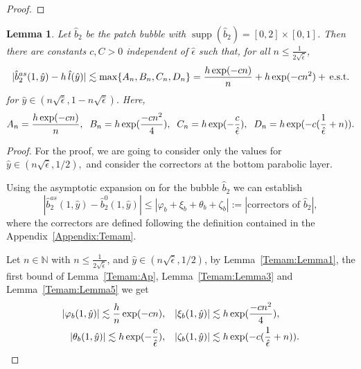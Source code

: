 \documentclass{article}
\newcommand{\est}{\text{\,e.s.t.}\xspace}
\newtheorem{lemma}[thm]{Lemma}
\newcommand{\N}{\ensuremath{\mathbb{N}}\xspace}
\DeclareMathOperator{\supp}{supp}
\newcommand{\hatb}{\ensuremath{\hat{b}}}
\newcommand{\haty}{\ensuremath{{\hat{y}}}}
\newcommand{\hatnsep}{\ensuremath{n\sqrt{\hat{\epsilon}}}}
\begin{document}
\begin{appendix}
\begin{proof}

\end{proof}


\begin{lemma}\label{lemma:new_lemma}
Let $\hat{b}_2$ be the patch bubble with $\supp(\hat{b}_2)=[0,2]\times[0,1]$. Then there are constants $c,C>0$ independent of $\hat{\epsilon}$ such that, for all $n\leq \frac{1}{2\sqrt{\hat{\epsilon}}}$,
\begin{equation*}
| \hatb_2^{as}(1,\hat y) - h\,\hat l(\haty)|\lesssim \max\{A_n,B_n,C_n,D_n\}=\frac{h\exp(-cn)}{n}+h\exp(-cn^2) + \est 
\end{equation*}
for $\haty\in(\hatnsep,1-\hatnsep).$ Here,
\begin{equation*}
    A_n = \frac{h\exp(-cn)}{n},\hspace{0.2 cm}
    B_n = h\exp(\frac{-c n^2}{4}),
    \hspace{0.2 cm}
    C_n = h\exp(-\frac{c}{\hat{\epsilon}}),
    \hspace{0.2 cm}
    D_n = h\exp(-c(\frac{1}{\hat{\epsilon}}+n)).
\end{equation*}
\end{lemma}

\begin{proof}
For the proof, we are going to consider only the values for $\haty\in(\hatnsep,1/2),$ and consider the correctors at the bottom parabolic layer. 

Using the asymptotic expansion on \cite{GieEtAl:13} for the bubble $\hatb_2$ we can establish
\begin{equation*}
    |\hatb_2^{as}(1,\haty)-\hatb_2^0(1,\haty)|\leq |\varphi_b + \xi_b +\theta_b + \zeta_b| :=
    |\text{correctors of $\hatb_2$}|,
\end{equation*}
where the correctors  are defined following the definition contained in the Appendix~\ref{Appendix:Temam}.

Let $n\in\N$ with $n\leq \frac{1}{2\sqrt{\hat{\epsilon}}}$, and $\haty\in(\hatnsep,1/2)$, by  Lemma~\ref{Temam:Lemma1},  the first bound of Lemma~\ref{Temam:Ap}, Lemma~\ref{Temam:Lemma3} and Lemma~\ref{Temam:Lemma5} we get
\begin{align*}
    |\varphi_b(1,\haty)|\lesssim \frac{h}{n}\exp(-cn),
    &\quad
    |\xi_b(1,\haty)|\lesssim 
     h\exp(\frac{-c n^2}{4}),
     \quad\\
    |\theta_b(1,\haty)|\lesssim h\exp(-\frac{c}{\hat{\epsilon}}),
    &\quad
    |\zeta_b(1,\haty)|\lesssim h\exp(-c(\frac{1}{\hat{\epsilon}}+n)).
    \qedhere
\end{align*}


\end{proof}
\end{appendix}
\end{document}
